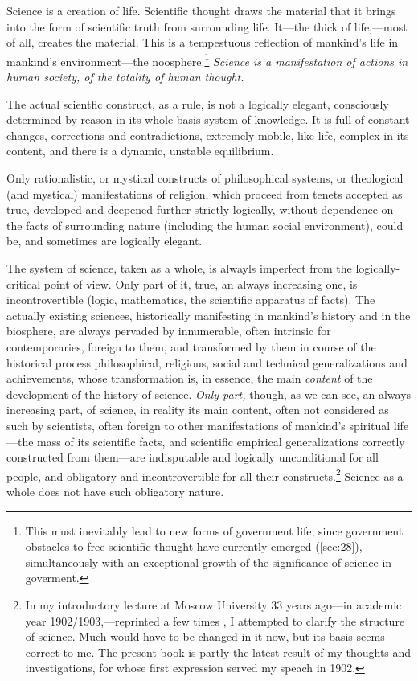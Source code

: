 Science is a creation of life.  Scientific thought draws the material that it
brings into the form of scientific truth from surrounding life.  It---the thick
of life,---most of all, creates the material.  This is a tempestuous reflection
of mankind's life in mankind's environment---the noosphere.\footnote{
	This must inevitably lead to new forms of government life, since
	government obstacles to free scientific thought have currently emerged
	(\autoref{sec:28}), simultaneously with an exceptional growth of the
	significance of science in goverment.
}
\emph{Science is a manifestation of actions in human society, of the totality
of human thought.}

The actual scientfic construct, as a rule, is not a logically
elegant,
consciously determined by reason in its whole basis system of knowledge.  It is
full of constant changes, corrections and contradictions, extremely mobile,
like life, complex in its content, and there is a dynamic, unstable
equilibrium.

Only rationalistic, or mystical constructs of philosophical systems, or
theological (and mystical) manifestations of religion, which proceed from
tenets accepted as true, developed and deepened further strictly logically,
without dependence on the facts of surrounding nature (including the human
social environment), could be, and sometimes are logically elegant.

The system of science, taken as a whole, is alwayls imperfect from the
logically-critical point of view.  Only part of it, true, an always increasing
one, is incontrovertible (logic, mathematics, the scientific apparatus of
facts).  The actually existing sciences, historically manifesting in mankind's
history and in the biosphere, are always pervaded by innumerable, often
intrinsic for contemporaries, foreign to them, and transformed by them in
course of the historical process philosophical, religious, social and technical
generalizations and achievements, whose transformation is, in essence, the main
\emph{content} of the development of the history of science.  \emph{Only part,}
though, as we can see, an always increasing part, of science, in reality its
main content, often not considered as such by scientists, often foreign to
other manifestations of mankind's spiritual life---the mass of its scientific
facts, and scientific empirical generalizations correctly constructed from
them---are indisputable and logically unconditional for all people, and
obligatory and incontrovertible for all their constructs.\footnote{
	In my introductory lecture at Moscow University 33 years ago---in
	academic year 1902/1903,---reprinted a few times
	, I attempted to clarify the
	structure of science.  Much would have to be changed in it now, but its
	basis seems correct to me.  The present book is partly the latest
	result of my thoughts and investigations, for whose first expression
	served my speach in 1902.
}
Science as a whole does not have such obligatory nature.


